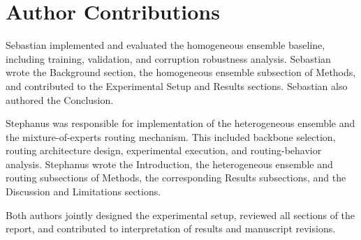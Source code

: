 \section*{Author Contributions}
Sebastian implemented and evaluated the homogeneous ensemble baseline, including training, validation, and corruption robustness analysis.
Sebastian wrote the Background section, the homogeneous ensemble subsection of Methods, and contributed to the Experimental Setup and Results sections.
Sebastian also authored the Conclusion.

Stephanus was responsible for implementation of the heterogeneous ensemble and the mixture-of-experts routing mechanism.
This included backbone selection, routing architecture design, experimental execution, and routing-behavior analysis.
Stephanus wrote the Introduction, the heterogeneous ensemble and routing subsections of Methods, the corresponding Results subsections, and the Discussion and Limitations sections.

Both authors jointly designed the experimental setup, reviewed all sections of the report, and contributed to interpretation of results and manuscript revisions.
